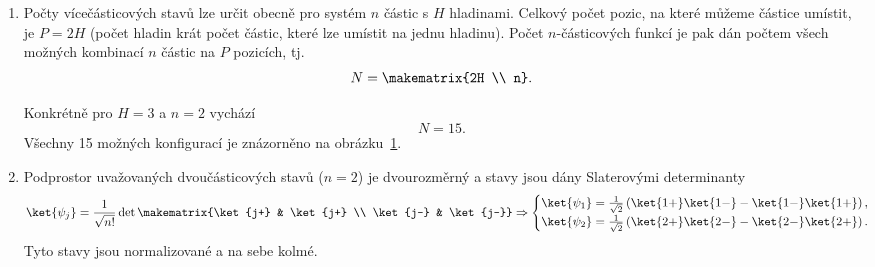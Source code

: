     \begin{solution}
        \begin{enumerate}
            \item Počty vícečásticových stavů lze určit obecně pro systém $n$ částic s $H$ hladinami.
                Celkový počet pozic, na které můžeme částice umístit, je $P=2H$ (počet hladin krát počet částic, které lze umístit na jednu hladinu).
                Počet $n$-částicových funkcí je pak dán počtem všech možných kombinací $n$ částic na $P$ pozicích, tj.
                \begin{equation}
                    N=\makematrix{2H \\ n}.
                \end{equation}

                Konkrétně pro $H=3$ a $n=2$ vychází
                \begin{equation}
                    N=15.
                \end{equation}
                Všechny 15 možných konfigurací je znázorněno na obrázku~\ref{fig:ThreeLevelTwoParticles}.

                \begin{figure}[!htbp]
                    \centering{}
                    \label{fig:ThreeLevelTwoParticles}
                \end{figure}				
            
            \item
                Podprostor uvažovaných dvoučásticových stavů ($n=2$) je dvourozměrný a stavy jsou dány Slaterovými determinanty
                \begin{equation}
                    \label{eq:ThreeLevelTwoPairs}
                    \ket{\psi_{j}}=\frac{1}{\sqrt{n!}}\det{\makematrix{\ket{j+} & \ket{j+} \\ \ket{j-} & \ket{j-}}}\Rightarrow
                    \begin{cases}
                        \ket{\psi_{1}}=\frac{1}{\sqrt{2}}\left(\ket{1+}\ket{1-}-\ket{1-}\ket{1+}\right),\\
                        \ket{\psi_{2}}=\frac{1}{\sqrt{2}}\left(\ket{2+}\ket{2-}-\ket{2-}\ket{2+}\right).
                    \end{cases}
                \end{equation}
                Tyto stavy jsou normalizované a na sebe kolmé.


\end{enumerate}
\end{solution}
